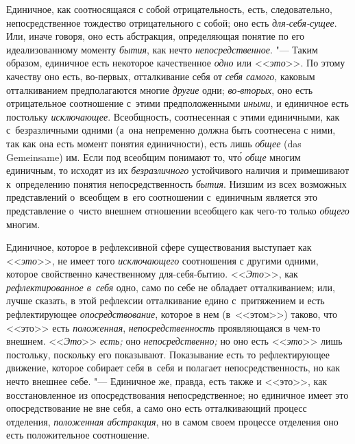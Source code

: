 Единичное, как соотносящаяся с собой отрицательность, есть, следовательно,
непосредственное тождество отрицательного с собой; оно есть
{\em для-себя-сущее}. Или, иначе говоря, оно есть абстракция, определяющая
понятие по его идеализованному моменту {\em бытия}, как нечто
{\em непосредственное}. "--- Таким образом, единичное есть некоторое
качественное {\em одно} или <<{\em это}>>. По этому качеству оно есть,
во-первых, отталкивание себя от {\em себя самого}, каковым отталкиванием
предполагаются многие {\em другие} одни; {\em во-вторых}, оно есть
отрицательное соотношение с~этими предположенными {\em иными}, и единичное есть
постольку {\em исключающее}. Всеобщность, соотнесенная с этими единичными, как
с~безразличными одними (а~она непременно должна быть соотнесена с ними, так как
она есть момент понятия единичности), есть лишь {\em общее} (das Gemein\-same)
им. Если под всеобщим понимают то, чт\'{о} {\em обще} многим единичным, то
исходят из их {\em безразличного} устойчивого наличия и примешивают
к~определению понятия непосредственность {\em бытия}. Низшим из всех возможных
представлений о~всеобщем в~его соотношении с~единичным является это
представление о~чисто внешнем отношении всеобщего как чего-то только
{\em общего} многим.

Единичное, которое в рефлексивной сфере существования
выступает как <<{\em это}>>, не имеет того {\em исключающего}
соотношения с другими одними, которое свойственно качественному для-себя-бытию.
<<{\em Это}>>, как {\em рефлектированное в~себя}
одно, само по себе не обладает отталкиванием; или, лучше
сказать, в этой рефлексии отталкивание едино
с~притяжением и есть рефлектирующее {\em опосредствование},
которое в нем (в~<<этом>>) таково, что <<это>> есть {\em положенная},
{\em непосредственность} проявляющаяся в чем-то внешнем. <<{\em Это}>>
{\em есть;} оно {\em непосредственно;} но оно есть <<{\em это}>> лишь
постольку, поскольку его показывают. Показывание есть то рефлектирующее
движение, которое собирает себя в~себя и полагает непосредственность, но
как нечто внешнее себе. "--- Единичное же,
правда, есть также и <<это>>, как восстановленное из опосредствования
непосредственное; но единичное имеет это опосредствование не вне себя, а
само оно есть отталкивающий процесс отделения, {\em положенная
абстракция},
но в самом своем процессе отделения оно есть положительное соотношение.

